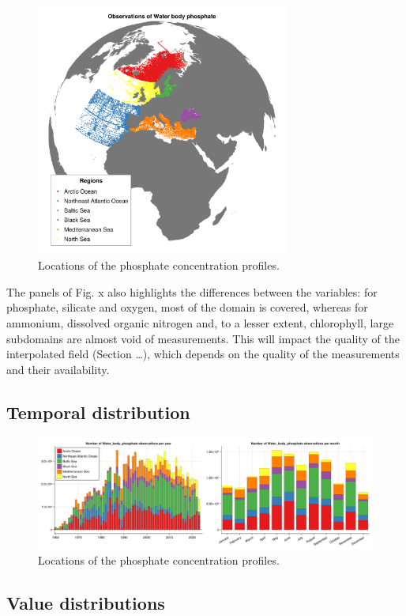 \documentclass[essd, manuscript]{copernicus}
\begin{document}
\begin{figure}[t]
\includegraphics[width=8.3cm]{observations_Water_body_phosphate.png}
\caption{Locations of the phosphate concentration profiles.\label{fig:phosphatedata}}
\end{figure}

The panels of Fig. x also highlights the differences between the variables: for phosphate, silicate and oxygen, most of the domain is covered, whereas for ammonium, dissolved organic nitrogen and, to a lesser extent, chlorophyll, large subdomains are almost void of measurements. This will impact the quality of the interpolated field (Section …), which depends on the quality of the measurements and their availability.




\subsection{Temporal distribution}

\begin{figure}[t]
\includegraphics[width=12cm]{stacked_histogram_Water_body_phosphate.png}
\caption{Locations of the phosphate concentration profiles.\label{fig:phosphatedata}}
\end{figure}


\subsection{Value distributions}
\end{document}
